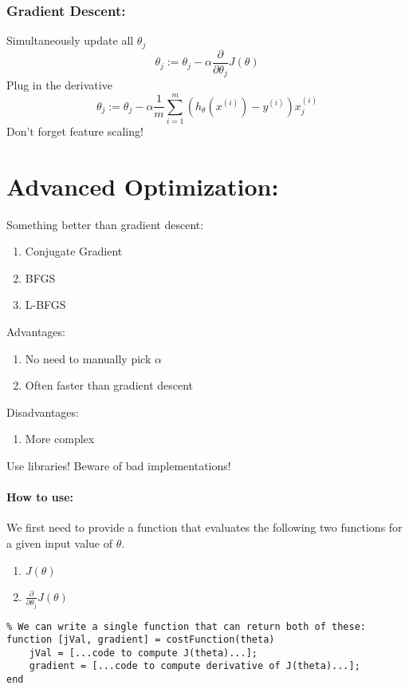 \documentclass[a4paper, 12pt]{report}
\begin{document}
\subsubsection{Gradient Descent:}
Simultaneously update all $\theta_j$
\begin{equation*}
	\theta_j := \theta_j - \alpha\frac{\partial}{\partial\theta_j}J(\theta)
\end{equation*}
Plug in the derivative
\begin{equation*}
	\theta_j := \theta_j - \alpha\frac{1}{m}\sum_{i=1}^m\left(
	h_\theta(x^{(i)}) - y^{(i)}
	\right)x_j^{(i)}
\end{equation*}
Don't forget feature scaling!

\section{Advanced Optimization:}
Something better than gradient descent:
\begin{enumerate}
	\item Conjugate Gradient
	\item BFGS
	\item L-BFGS
\end{enumerate}
Advantages:
\begin{enumerate}
	\item No need to manually pick $\alpha$
	\item Often faster than gradient descent
\end{enumerate}
Disadvantages:
\begin{enumerate}
	\item More complex
\end{enumerate}
Use libraries! Beware of bad implementations!

\paragraph{How to use:}
We first need to provide a function that evaluates the following two functions
for a given input value of $\theta$.
\begin{enumerate}
	\item $J(\theta)$
	\item $\frac{\partial}{\partial\theta_j}J(\theta)$
\end{enumerate}

\begin{verbatim}
% We can write a single function that can return both of these:
function [jVal, gradient] = costFunction(theta)
	jVal = [...code to compute J(theta)...];
	gradient = [...code to compute derivative of J(theta)...];
end
\end{verbatim}
\end{document}
